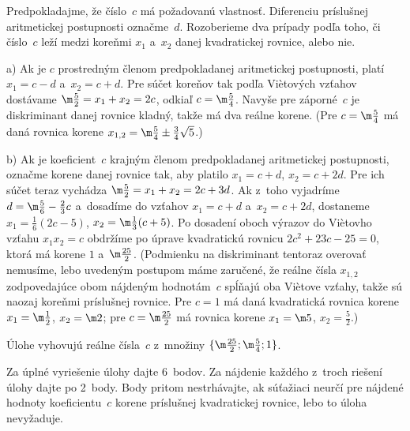 {%
Predpokladajme, že číslo~$c$ má požadovanú vlastnosť. Diferenciu príslušnej aritmetickej
postupnosti označme~$d$. Rozoberieme dva prípady podľa toho,
či číslo~$c$ leží medzi koreňmi $x_1$ a~$x_2$ danej kvadratickej rovnice, alebo nie.

\smallskip
a) Ak je $c$ prostredným členom predpokladanej aritmetickej postupnosti,
platí $x_1=c-d$ a~$x_2=c+d$. Pre súčet koreňov tak podľa Vi\`etových vzťahov
dostávame $\m\frac52=x_1+x_2=2c$, odkiaľ $c=\m\frac54$. Navyše pre záporné~$c$
je diskriminant danej rovnice kladný, takže má dva reálne korene.
(Pre $c=\m\frac54$ má daná rovnica
korene $x_{1,2}=\m\frac54\pm\frac34\sqrt{5}$.)

\smallskip
b) Ak je koeficient~$c$ krajným členom predpokladanej aritmetickej postupnosti,
označme korene danej rovnice tak, aby platilo
$x_1=c+d$, $x_2=c+2d$. Pre ich súčet %
teraz vychádza
$\m\frac52=x_1+x_2=2c+3d$. Ak z~toho vyjadríme $d={\m\frac56}-\frac23c$ a~dosadíme do
vzťahov $x_1=c+d$ a~$x_2=c+2d$, dostaneme
$x_1=\frac16(2c-5)$, $x_2=\m\frac13(c+5)$. Po dosadení oboch výrazov do
Vi\`etovho vzťahu $x_1x_2=c$ %
obdržíme po
úprave kvadratickú rovnicu $2c^2+23c-25=0$, ktorá má korene $1$ a~$\m\frac{25}2$.
(Podmienku na diskriminant tentoraz overovať
nemusíme, lebo uvedeným postupom máme zaručené, že reálne čísla $x_{1,2}$
zodpovedajúce obom nájdeným hodnotám~$c$ spĺňajú oba Vi\`etove vzťahy,
takže sú naozaj koreňmi príslušnej rovnice. Pre $c=1$ má daná kvadratická rovnica korene
$x_1=\m\frac12$, $x_2=\m2$; pre $c=\m\frac{25}2$ má rovnica korene
$x_1=\m5$, $x_2=\frac52$.)

\zaver
Úlohe vyhovujú reálne čísla~$c$ z~množiny $\{\m\frac{25}2;\m\frac54;1\}$.

\nobreak\medskip\petit\noindent
Za úplné vyriešenie úlohy dajte 6~bodov. Za nájdenie každého z~troch
riešení úlohy dajte po 2~body. Body pritom
nestrhávajte, ak súťažiaci neurčí pre nájdené hodnoty koeficientu~$c$
korene príslušnej kvadratickej rovnice, lebo to úloha nevyžaduje.
\endpetit
\bigbreak
}

